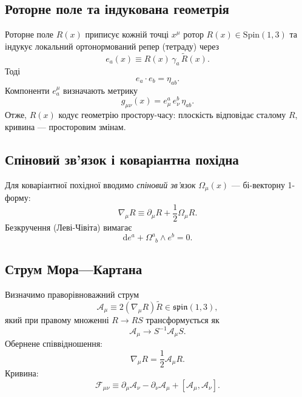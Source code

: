 \documentclass[11pt,a4paper]{article}
\numberwithin{equation}{section}
\theoremstyle{plain}
\theoremstyle{definition}
\theoremstyle{remark}
\newcommand{\dd}{\mathrm{d}}
\begin{document}
\subsection{Роторне поле та індукована геометрія}

Роторне поле $R(x)$ приписує кожній точці $x^\mu$ ротор $R(x) \in \mathrm{Spin}(1,3)$ та індукує локальний ортонормований репер (тетраду) через
\begin{equation}
e_a(x) \equiv R(x)\, \gamma_a\, \widetilde{R}(x).
\label{eq:tetrad-def}
\end{equation}
Тоді
\begin{equation}
e_a \cdot e_b = \eta_{ab}.
\end{equation}
Компоненти $e_a^\mu$ визначають метрику
\begin{equation}
g_{\mu\nu}(x) = e_\mu^a\, e_\nu^b\, \eta_{ab}.
\label{eq:metric-def}
\end{equation}
Отже, $R(x)$ кодує геометрію простору-часу: плоскість відповідає сталому $R$, кривина — просторовим змінам.

\subsection{Спіновий зв’язок і коваріантна похідна}

Для коваріантної похідної вводимо \emph{спіновий зв’язок} $\Omega_\mu(x)$ — бі-векторну 1-форму:
\begin{equation}
\nabla_\mu R \equiv \partial_\mu R + \frac{1}{2}\Omega_\mu R.
\label{eq:covariant-def}
\end{equation}
Безкручення (Леві-Чівіта) вимагає
\begin{equation}
\dd e^a + \Omega^a_{\phantom{a}b} \wedge e^b = 0.
\label{eq:torsion-free}
\end{equation}

\subsection{Струм Мора—Картана}

Визначимо праворівноважний струм
\begin{equation}
\mathcal{A}_\mu \equiv 2(\nabla_\mu R)\widetilde{R}\in \mathfrak{spin}(1,3),
\label{eq:MC}
\end{equation}
який при правому множенні $R\to RS$ трансформується як
\begin{equation}
\mathcal{A}_\mu \to S^{-1}\mathcal{A}_\mu S.
\end{equation}
Обернене співвідношення:
\begin{equation}
\nabla_\mu R = \frac{1}{2}\mathcal{A}_\mu R.
\label{eq:nabla-from-A}
\end{equation}
Кривина:
\begin{equation}
\mathcal{F}_{\mu\nu} \equiv \partial_\mu\mathcal{A}_\nu - \partial_\nu\mathcal{A}_\mu + [\mathcal{A}_\mu, \mathcal{A}_\nu].
\label{eq:field-strength}
\end{equation}
\end{document}
